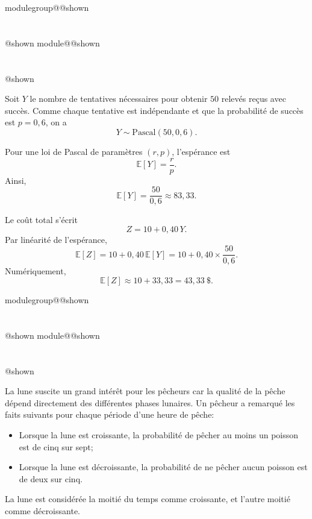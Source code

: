 \documentclass{Evaluation}
\makeatletter
\newcommand{\currentmodulekey}{}
\newcommand{\currentmoduletitle}{}
\newcommand{\currentgroupkey}{}
\newcommand{\currentgrouptitle}{}
\newcommand{\showmoduleifneeded}{%
  \ifx\currentgroupkey\empty\else
    \expandafter\ifx\csname modulegroup@\currentgroupkey @shown\endcsname\relax
      \section*{\currentgrouptitle}%
      \expandafter\gdef\csname modulegroup@\currentgroupkey @shown\endcsname{1}%
    \fi
  \fi
  \expandafter\ifx\csname module@\currentmodulekey @shown\endcsname\relax
    \section*{\currentmoduletitle}%
    \expandafter\gdef\csname module@\currentmodulekey @shown\endcsname{1}%
  \fi
}
\newenvironment{A23}{\showmoduleifneeded}{}
\newenvironment{H26r}{\showmoduleifneeded}{}
\makeatother
\begin{document}
\begin{questions}
\begin{H26r}
\begin{parts}
\begin{solution}
Soit $Y$ le nombre de tentatives nécessaires pour obtenir $50$ relevés
reçus avec succès. Comme chaque tentative est indépendante et que la
probabilité de succès est $p=0{,}6$, on a
\[
Y \sim \text{Pascal}(50,0{,}6).
\]

Pour une loi de Pascal de paramètres $(r,p)$, l’espérance est
\[
\mathbb E[Y] = \frac{r}{p}.
\]
Ainsi,
\[
\mathbb E[Y] = \frac{50}{0{,}6} \approx 83{,}33.
\]

Le coût total s’écrit
\[
Z = 10 + 0{,}40\,Y.
\]
Par linéarité de l’espérance,
\[
\mathbb E[Z]
= 10 + 0{,}40\,\mathbb E[Y]
= 10 + 0{,}40 \times \frac{50}{0{,}6}.
\]
Numériquement,
\[
\mathbb E[Z] \approx 10 + 33{,}33 = 43{,}33\ \text{\$}.
\]
\end{solution}

\end{parts}
\end{H26r}

\begin{A23}
\question {} %
La lune suscite un grand intérêt pour les pêcheurs car la qualité de la pêche dépend directement des différentes phases lunaires. Un pêcheur a remarqué les faits suivants pour chaque période d'une heure de pêche:

\begin{itemize}
    \item Lorsque la lune est croissante, la probabilité de pêcher au moins un poisson est de cinq sur sept;
    \item Lorsque la lune est décroissante, la probabilité de ne pêcher aucun poisson est de deux sur cinq.
\end{itemize}
La lune est considérée la moitié du temps comme croissante, et l'autre moitié comme décroissante.

\end{A23}
\end{questions}
\end{document}
